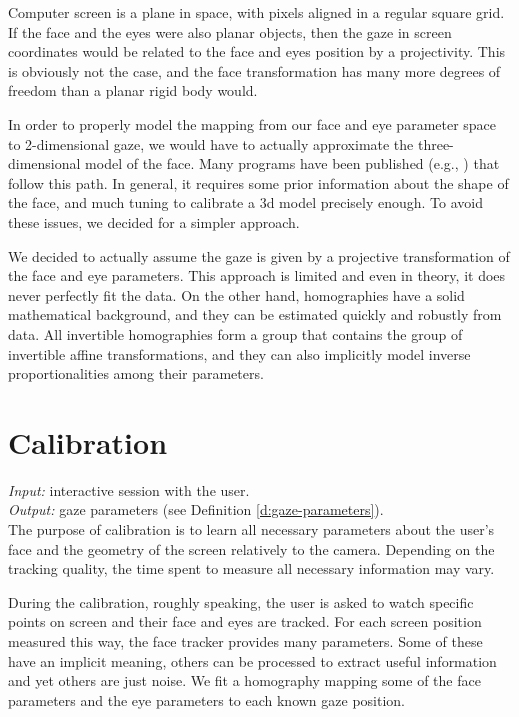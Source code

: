 Computer screen is a plane in space, with pixels aligned in a regular square grid.
If the face and the eyes were also planar objects, then the gaze in screen coordinates would be related to the face and eyes position by a projectivity.
This is obviously not the case, and the face transformation has many more degrees of freedom than a planar rigid body would.
 
In order to properly model the mapping from our face and eye parameter space to 2-dimensional gaze, we would have to actually approximate the three-dimensional model of the face.
Many programs have been published (e.g., \cite{fanelli11}) that follow this path.
In general, it requires some prior information about the shape of the face, and much tuning to calibrate a 3d model precisely enough.
To avoid these issues, we decided for a simpler approach.

We decided to actually assume the gaze is given by a projective transformation of the face and eye parameters.
This approach is limited and even in theory, it does never perfectly fit the data.
On the other hand, homographies have a solid mathematical background, and they can be estimated quickly and robustly from data.
All invertible homographies form a group that contains the group of invertible affine transformations, and they can also implicitly model inverse proportionalities among their parameters.



\section{Calibration}

\textit{Input:} interactive session with the user.\\
\textit{Output:} gaze parameters (see Definition \ref{d:gaze-parameters}).\\

The purpose of calibration is to learn all necessary parameters about the user's face and the geometry of the screen relatively to the camera.
Depending on the tracking quality, the time spent to measure all necessary information may vary.

During the calibration, roughly speaking, the user is asked to watch specific points on screen and their face and eyes are tracked.
For each screen position measured this way, the face tracker provides many parameters.
Some of these have an implicit meaning, others can be processed to extract useful information and yet others are just noise.
We fit a homography mapping some of the face parameters and the eye parameters to each known gaze position.

